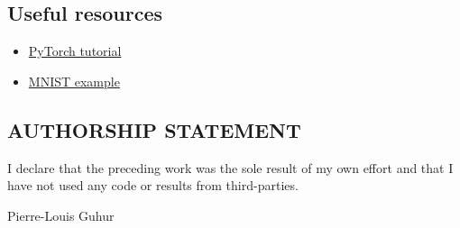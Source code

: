 \documentclass[11pt]{article}
\providecommand{\tightlist}{%
      \setlength{\itemsep}{0pt}\setlength{\parskip}{0pt}}
\begin{document}
    \hypertarget{useful-resources}{%
\subsection{Useful resources}\label{useful-resources}}

\begin{itemize}
\tightlist
\item
  \href{http://pytorch.org/tutorials/beginner/blitz/neural_networks_tutorial.html\#sphx-glr-beginner-blitz-neural-networks-tutorial-py}{PyTorch
  tutorial}
\item
  \href{https://github.com/pytorch/examples/tree/master/mnist}{MNIST
  example}
\end{itemize}

    \hypertarget{authorship-statement}{%
\subsection{AUTHORSHIP STATEMENT}\label{authorship-statement}}

I declare that the preceding work was the sole result of my own effort
and that I have not used any code or results from third-parties.

Pierre-Louis Guhur


    
    
    
    
\end{document}
